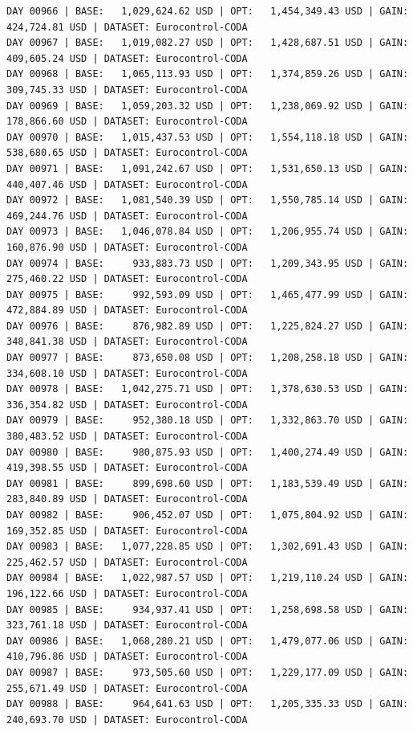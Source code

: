 \documentclass[11pt,a4paper]{article}
\begin{document}
\begin{verbatim}
DAY 00966 | BASE:   1,029,624.62 USD | OPT:   1,454,349.43 USD | GAIN: 424,724.81 USD | DATASET: Eurocontrol-CODA
DAY 00967 | BASE:   1,019,082.27 USD | OPT:   1,428,687.51 USD | GAIN: 409,605.24 USD | DATASET: Eurocontrol-CODA
DAY 00968 | BASE:   1,065,113.93 USD | OPT:   1,374,859.26 USD | GAIN: 309,745.33 USD | DATASET: Eurocontrol-CODA
DAY 00969 | BASE:   1,059,203.32 USD | OPT:   1,238,069.92 USD | GAIN: 178,866.60 USD | DATASET: Eurocontrol-CODA
DAY 00970 | BASE:   1,015,437.53 USD | OPT:   1,554,118.18 USD | GAIN: 538,680.65 USD | DATASET: Eurocontrol-CODA
DAY 00971 | BASE:   1,091,242.67 USD | OPT:   1,531,650.13 USD | GAIN: 440,407.46 USD | DATASET: Eurocontrol-CODA
DAY 00972 | BASE:   1,081,540.39 USD | OPT:   1,550,785.14 USD | GAIN: 469,244.76 USD | DATASET: Eurocontrol-CODA
DAY 00973 | BASE:   1,046,078.84 USD | OPT:   1,206,955.74 USD | GAIN: 160,876.90 USD | DATASET: Eurocontrol-CODA
DAY 00974 | BASE:     933,883.73 USD | OPT:   1,209,343.95 USD | GAIN: 275,460.22 USD | DATASET: Eurocontrol-CODA
DAY 00975 | BASE:     992,593.09 USD | OPT:   1,465,477.99 USD | GAIN: 472,884.89 USD | DATASET: Eurocontrol-CODA
DAY 00976 | BASE:     876,982.89 USD | OPT:   1,225,824.27 USD | GAIN: 348,841.38 USD | DATASET: Eurocontrol-CODA
DAY 00977 | BASE:     873,650.08 USD | OPT:   1,208,258.18 USD | GAIN: 334,608.10 USD | DATASET: Eurocontrol-CODA
DAY 00978 | BASE:   1,042,275.71 USD | OPT:   1,378,630.53 USD | GAIN: 336,354.82 USD | DATASET: Eurocontrol-CODA
DAY 00979 | BASE:     952,380.18 USD | OPT:   1,332,863.70 USD | GAIN: 380,483.52 USD | DATASET: Eurocontrol-CODA
DAY 00980 | BASE:     980,875.93 USD | OPT:   1,400,274.49 USD | GAIN: 419,398.55 USD | DATASET: Eurocontrol-CODA
DAY 00981 | BASE:     899,698.60 USD | OPT:   1,183,539.49 USD | GAIN: 283,840.89 USD | DATASET: Eurocontrol-CODA
DAY 00982 | BASE:     906,452.07 USD | OPT:   1,075,804.92 USD | GAIN: 169,352.85 USD | DATASET: Eurocontrol-CODA
DAY 00983 | BASE:   1,077,228.85 USD | OPT:   1,302,691.43 USD | GAIN: 225,462.57 USD | DATASET: Eurocontrol-CODA
DAY 00984 | BASE:   1,022,987.57 USD | OPT:   1,219,110.24 USD | GAIN: 196,122.66 USD | DATASET: Eurocontrol-CODA
DAY 00985 | BASE:     934,937.41 USD | OPT:   1,258,698.58 USD | GAIN: 323,761.18 USD | DATASET: Eurocontrol-CODA
DAY 00986 | BASE:   1,068,280.21 USD | OPT:   1,479,077.06 USD | GAIN: 410,796.86 USD | DATASET: Eurocontrol-CODA
DAY 00987 | BASE:     973,505.60 USD | OPT:   1,229,177.09 USD | GAIN: 255,671.49 USD | DATASET: Eurocontrol-CODA
DAY 00988 | BASE:     964,641.63 USD | OPT:   1,205,335.33 USD | GAIN: 240,693.70 USD | DATASET: Eurocontrol-CODA

\end{verbatim}
\end{document}
